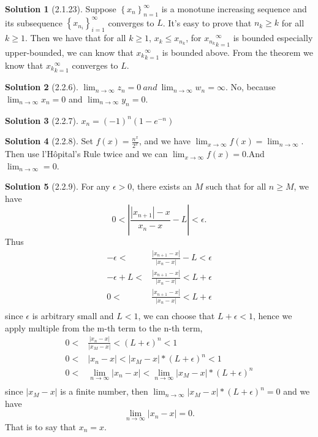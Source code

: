 \documentclass{article}
\theoremstyle{definition}
\newtheorem{sol}{Solution}[exe]
\begin{document}
\begin{sol}[2.1.23]

Suppose $\left\{x_{n}\right\}_{n=1}^{\infty}$ is a monotune increasing sequence and its subsequence $\left\{x_{n_{i}}\right\}_{i=1}^{\infty}$ converges to $L$.
It's easy to prove that $n_{k}\geq k$ for all $k\geq 1$. Then we have that for all $k\geq 1$, $x_{k}\leq x_{n_{k}}$, for ${x_{n_{k}}}_{k=1}^{\infty}$ is bounded especially upper-bounded, we can 
know that ${x_{k}}_{k=1}^{\infty}$ is bounded above. From the theorem we know that ${x_{k}}_{k=1}^{\infty}$ converges to $L$.
\end{sol}

\begin{sol}[2.2.6]

    $\lim_{n\to\infty}z_{n}=0\ and\ \lim_{n\to\infty}w_{n}=\infty$. No, because $\lim_{n\to\infty}x_{n}=0$ and $\lim_{n\to\infty}y_{n}=0$.
\end{sol}

\begin{sol}[2.2.7]

    $x_{n} = (-1)^{n} (1-e^{-n})$
\end{sol}

\begin{sol}[2.2.8]
    Set $f(x)=\frac{n^{x}}{2^{x}}$, and we have $\lim_{x\to\infty}f(x)=\lim_{n\to\infty}$.
    Then use l'Hôpital's Rule twice and we can  $\lim_{x\to\infty}f(x)=0$.And $\lim_{n\to\infty}=0$.
\end{sol}

\begin{sol}[2.2.9]

    For any $\epsilon>0$, there exists an $M$ such that for all $n\geq M$, we have 
    $$0<|\frac{|x_{n+1}|-x}{x_{n}-x}-L|<\epsilon.$$
    Thus \begin{align*}
        -\epsilon<& \frac{|x_{n+1}-x|}{|x_{n}-x|}-L<\epsilon\\
        -\epsilon+L<& \frac{|x_{n+1}-x|}{|x_{n}-x|}<L+\epsilon\\
        0<& \frac{|x_{n+1}-x|}{|x_{n}-x|}<L+\epsilon\\
    \end{align*}
    since $\epsilon$ is arbitrary small and $L<1$, we can choose that $L+\epsilon<1$, hence we apply multiple from the m-th term to the n-th term, 
    \begin{align*}
        0<& \frac{|x_{n}-x|}{|x_{M}-x|}<(L+\epsilon)^{n}<1\\
        0<& |x_{n}-x|<|x_{M}-x|*{(L+\epsilon)^{n}}<1\\
        0<& \lim_{n\to\infty}|x_{n}-x|<\lim_{n\to\infty}|x_{M}-x|*{(L+\epsilon)^{n}}\\
    \end{align*}
    since $|x_{M}-x|$ is a finite number, then $\lim_{n\to\infty}|x_{M}-x|*{(L+\epsilon)^{n}}=0$ and we have 
    $$\lim_{n\to\infty}|x_{n}-x|=0.$$
    That is to say that $x_{n}=x$.
\end{sol}
\end{document}

